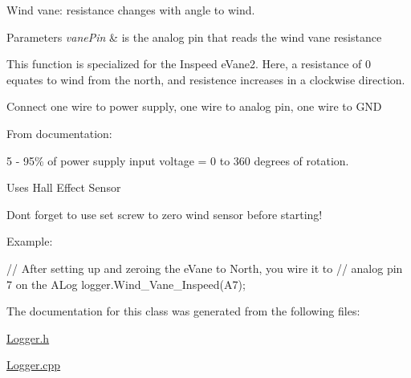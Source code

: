 Wind vane\+: resistance changes with angle to wind.


\begin{DoxyParams}{Parameters}
{\em vane\+Pin} & is the analog pin that reads the wind vane resistance\\
\hline
\end{DoxyParams}
This function is specialized for the Inspeed e\+Vane2. Here, a resistance of 0 equates to wind from the north, and resistence increases in a clockwise direction.

Connect one wire to power supply, one wire to analog pin, one wire to G\+ND

From documentation\+:
\begin{DoxyItemize}
\item 5 -\/ 95\% of power supply input voltage = 0 to 360 degrees of rotation.
\item Uses Hall Effect Sensor
\item Don\textquotesingle{}t forget to use set screw to zero wind sensor before starting!
\end{DoxyItemize}

Example\+: 
\begin{DoxyCode}
\textcolor{comment}{// After setting up and zeroing the eVane to North, you wire it to }
\textcolor{comment}{// analog pin 7 on the ALog}
logger.Wind\_Vane\_Inspeed(A7);
\end{DoxyCode}


The documentation for this class was generated from the following files\+:\begin{DoxyCompactItemize}
\item 
\hyperlink{Logger_8h}{Logger.\+h}\item 
\hyperlink{Logger_8cpp}{Logger.\+cpp}\end{DoxyCompactItemize}

